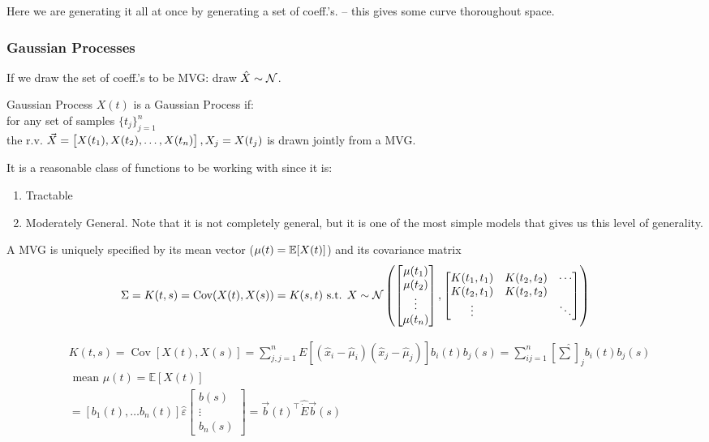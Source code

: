 Here we are generating it all at once by generating a set of coeff.'s. -- this gives some curve thoroughout space.


\subsubsection{Gaussian Processes}
If we draw the set of coeff.'s to be MVG: draw $\hat{X}\sim\mathcal{N}$.
\begin{defn}{Gaussian Process}
$X(t)$ is a Gaussian Process if: \\
for any set of samples $\{t_j\}_{j=1}^n$\\
the r.v. $\vec{X}=\begin{bmatrix}
    X(t_1), X(t_2), \ldots, X(t_n)
\end{bmatrix}, X_j = X(t_j)$ is drawn jointly from a MVG.
\end{defn}


It is a reasonable class of functions to be working with since it is:
\begin{enumerate}
    \item Tractable
    \item Moderately General. Note that it is not completely general, but it is one of the most simple models that gives us this level of generality.
\end{enumerate}

A MVG is uniquely specified by its mean vector 
($\mu(t)=\mathbb{E}[X(t)]$) 
and its covariance matrix 
$$\Sigma=K(t, s)=\text{Cov}(X(t), X(s))=K(s, t)\text{ s.t. } {X}\sim\mathcal{N}\left(\begin{bmatrix}
 \mu(t_1) \\ \mu(t_2) \\ \vdots \\ \mu(t_n)
\end{bmatrix}, \begin{bmatrix}
 K(t_1, t_1) & K(t_2, t_2) & \cdots \\ 
 K(t_2, t_1) & K(t_2, t_2) &  \\ 
 \vdots &  & \ddots \\ 
\end{bmatrix}\right)
$$

\begin{align*}
& K(t, s)=\operatorname{Cov}[X(t), X(s)]=\sum_{j, j=1}^n E\left[\left(\hat{x}_i-\hat{\mu}_i\right)\left(\hat{x}_j-\hat{\mu}_j\right)\right] b_i(t) b_j(s)=\sum_{i j=1}^n\left[\hat{\sum}\right]_j b_i(t) b_j(s) \\
& \text { mean } \mu(t)=\mathbb{E}[X(t)] \\
& =\left[b_1(t), \ldots b_n(t)\right] \hat{\varepsilon}\begin{bmatrix}
b(s) \\
\vdots \\
b_n(s)
\end{bmatrix}=\vec{b}(t)^{\top} \hat{\dot{E}} \vec{b}(s) \\
&
\end{align*}

